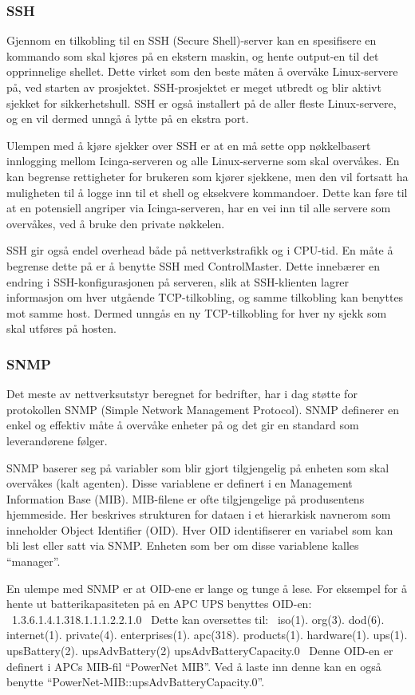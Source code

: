 \subsubsection{SSH}
Gjennom en tilkobling til en SSH (Secure Shell)-server kan en spesifisere en kommando som skal kjøres på en ekstern maskin, og hente output-en til det opprinnelige shellet. Dette virket som den beste måten å overvåke Linux-servere på, ved starten av prosjektet. SSH-prosjektet er meget utbredt og blir aktivt sjekket for sikkerhetshull. SSH er også installert på de aller fleste Linux-servere, og en vil dermed unngå å lytte på en ekstra port.

Ulempen med å kjøre sjekker over SSH er at en må sette opp nøkkelbasert innlogging mellom Icinga-serveren og alle Linux-serverne som skal overvåkes. En kan begrense rettigheter for brukeren som kjører sjekkene, men den vil fortsatt ha muligheten til å logge inn til et shell og eksekvere kommandoer. Dette kan føre til at en potensiell angriper via Icinga-serveren, har en vei inn til alle servere som overvåkes, ved å bruke den private nøkkelen.

SSH gir også endel overhead både på nettverkstrafikk og i CPU-tid\cite{sshmanpage}. En måte å begrense dette på er å benytte SSH med ControlMaster. Dette innebærer en endring i SSH-konfigurasjonen på serveren, slik at SSH-klienten lagrer informasjon om hver utgående TCP-tilkobling, og samme tilkobling kan benyttes mot samme host. Dermed unngås en ny TCP-tilkobling for hver ny sjekk som skal utføres på hosten.

\subsubsection{SNMP}
Det meste av nettverksutstyr beregnet for bedrifter, har i dag støtte for protokollen SNMP (Simple Network Management Protocol\cite{essentialsnmp}). SNMP definerer en enkel og effektiv måte å overvåke enheter på og det gir en standard som leverandørene følger.
	
SNMP baserer seg på variabler som blir gjort tilgjengelig på enheten som skal overvåkes (kalt agenten). Disse variablene er definert i en Management Information Base (MIB). MIB-filene er ofte tilgjengelige på produsentens hjemmeside. Her beskrives strukturen for dataen i et hierarkisk navnerom som inneholder Object Identifier (OID). Hver OID identifiserer en variabel som kan bli lest eller satt via SNMP. Enheten som ber om disse variablene kalles ``manager''. 

En ulempe med SNMP er at OID-ene er lange og tunge å lese. For eksempel for å hente ut batterikapasiteten på en APC UPS benyttes OID-en:
\
1.3.6.1.4.1.318.1.1.1.2.2.1.0
\
Dette kan oversettes til:
\
iso(1). org(3). dod(6). internet(1). private(4). enterprises(1). apc(318). products(1). hardware(1). ups(1). upsBattery(2). upsAdvBattery(2) upsAdvBatteryCapacity.0
\
Denne OID-en er definert i APCs MIB-fil ``PowerNet MIB''. Ved å laste inn denne kan en også benytte ``PowerNet-MIB::upsAdvBatteryCapacity.0''.

